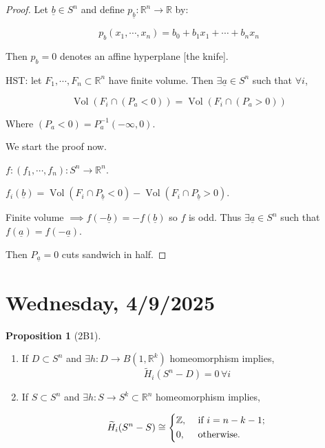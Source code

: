 \documentclass{article}
\theoremstyle{definition}
\newtheorem{proposition}[theorem]{Proposition}
\begin{document}
    \begin{proof}
        Let \(\underline{b} \in S^n\) and define \(p_{\underline{b}} : \mathbb{R}^n \to \mathbb{R}\) by:
        
        \[
            p_b (x_1, \cdots , x_n) = b_0 + b_1 x_1 + \cdots + b_n x_n
        \]

        Then \(p_b = 0\) denotes an affine hyperplane [the knife].

        HST: let \(F_1, \cdots , F_n \subset \mathbb{R}^n\) have finite volume. Then \(\exists \underline{a} \in S^n\) such that \(\forall i\),
        
        \[
            \operatorname{Vol}(F_i \cap (P_a < 0)) = \operatorname{Vol}(F_i \cap (P_a > 0))
        \]

        Where \((P_a < 0) = P_a ^{-1} (-\infty , 0)\).

        We start the proof now.

        \(f: (f_1, \cdots , f_n): S^n \to \mathbb{R}^n\).

        \(f_i(\underline{b}) = \operatorname{Vol}(F_i \cap P_{\underline{b}} < 0) - \operatorname{Vol}(F_i \cap P_{\underline{b}} > 0)\).
        
        Finite volume \(\implies f(-\underline{b}) = - f(\underline{b})\) so \(f\) is odd. Thus \(\exists \underline{a} \in S^n\) such that \(f(\underline{a}) = f(-\underline{a})\).
        
        Then \(P_{\underline{a}} = 0\) cuts sandwich in half. 
    \end{proof}

    \section*{Wednesday, 4/9/2025}
    
    \begin{proposition}
        [2B1]

        \begin{enumerate}[label=\alph*)]
            \item If \(D \subset S^n\) and \(\exists h: D \to B(1,\mathbb{R}^k)\) homeomorphism implies,
            \[
                \widetilde{H}_i(S^n - D) = 0 \, \forall i
            \]

            \item If \(S \subset S^n\) and \(\exists h: S \to S^k \subset \mathbb{R}^n\) homeomorphism implies,
            
            \[
                \widetilde{H}_i(S^n - S) \cong \begin{dcases}
                    \mathbb{Z}, &\text{ if } i=n-k-1 ;\\
                    0, &\text{ otherwise} .
                \end{dcases}
            \]
        \end{enumerate} 
    \end{proposition}
\end{document}
